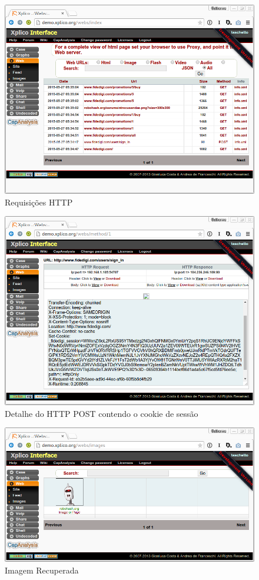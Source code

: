 \documentclass[12pt]{article}
\begin{document}
\begin{figure}[ht]
    \centering
    \includegraphics[scale=0.4]{img/1.png}
    \caption{Requisições HTTP}
    \label{fig:http}
\end{figure}

\begin{figure}[ht]
    \centering
    \includegraphics[scale=0.4]{img/3.png}
    \caption{Detalhe do HTTP POST contendo o cookie de sessão}
    \label{fig:cookie}
\end{figure}

\begin{figure}[ht]
    \centering
    \includegraphics[scale=0.4]{img/4.png}
    \caption{Imagem Recuperada}
    \label{fig:imagem}
\end{figure}
\end{document}
